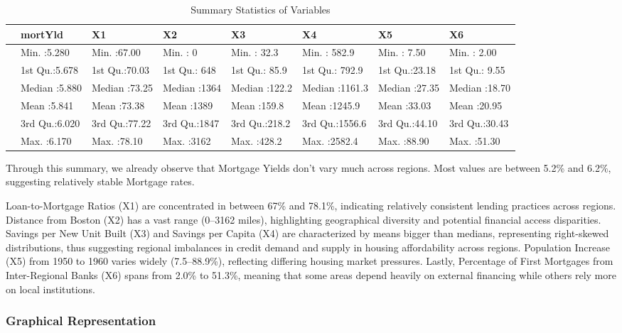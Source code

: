 \documentclass[
  11pt,
]{article}
\begin{document}
\begin{longtable}[t]{llllllll}
\caption{\label{tab:unnamed-chunk-3}Summary Statistics of Variables}\\
\toprule
 & mortYld & X1 & X2 & X3 & X4 & X5 & X6\\
\midrule
 & Min.   :5.280 & Min.   :67.00 & Min.   :   0 & Min.   : 32.3 & Min.   : 582.9 & Min.   : 7.50 & Min.   : 2.00\\
 & 1st Qu.:5.678 & 1st Qu.:70.03 & 1st Qu.: 648 & 1st Qu.: 85.9 & 1st Qu.: 792.9 & 1st Qu.:23.18 & 1st Qu.: 9.55\\
 & Median :5.880 & Median :73.25 & Median :1364 & Median :122.2 & Median :1161.3 & Median :27.35 & Median :18.70\\
 & Mean   :5.841 & Mean   :73.38 & Mean   :1389 & Mean   :159.8 & Mean   :1245.9 & Mean   :33.03 & Mean   :20.95\\
 & 3rd Qu.:6.020 & 3rd Qu.:77.22 & 3rd Qu.:1847 & 3rd Qu.:218.2 & 3rd Qu.:1556.6 & 3rd Qu.:44.10 & 3rd Qu.:30.43\\
\addlinespace
 & Max.   :6.170 & Max.   :78.10 & Max.   :3162 & Max.   :428.2 & Max.   :2582.4 & Max.   :88.90 & Max.   :51.30\\
\bottomrule
\end{longtable}
\endgroup{}

Through this summary, we already observe that Mortgage Yields don't vary
much across regions. Most values are between 5.2\% and 6.2\%, suggesting
relatively stable Mortgage rates.

Loan-to-Mortgage Ratios (X1) are concentrated in between 67\% and
78.1\%, indicating relatively consistent lending practices across
regions. Distance from Boston (X2) has a vast range (0--3162 miles),
highlighting geographical diversity and potential financial access
disparities. Savings per New Unit Built (X3) and Savings per Capita (X4)
are characterized by means bigger than medians, representing
right-skewed distributions, thus suggesting regional imbalances in
credit demand and supply in housing affordability across regions.
Population Increase (X5) from 1950 to 1960 varies widely (7.5--88.9\%),
reflecting differing housing market pressures. Lastly, Percentage of
First Mortgages from Inter-Regional Banks (X6) spans from 2.0\% to
51.3\%, meaning that some areas depend heavily on external financing
while others rely more on local institutions.

\subsubsection{Graphical Representation}\label{graphical-representation}
\end{document}
